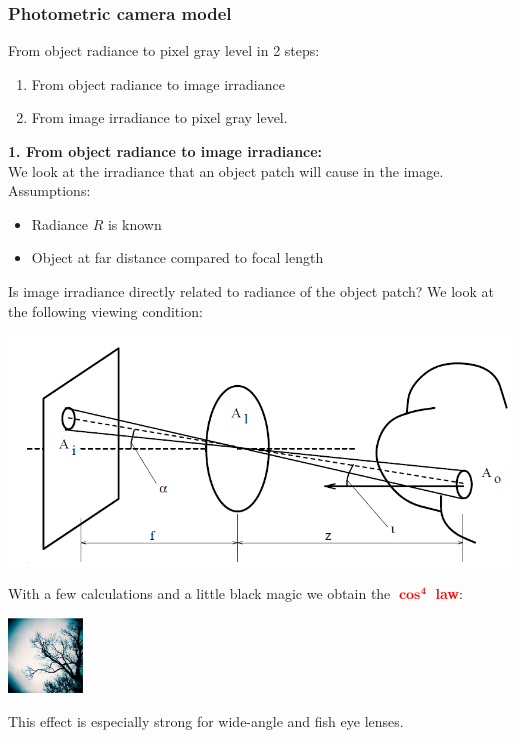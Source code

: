 \documentclass[a4paper, fontsize=8pt, landscape, DIV=1]{scrartcl}
\begin{document}
\begin{multicols*}{4}
		\subsubsection{Photometric camera model}
		From object radiance to pixel gray level in 2 steps: 
		\begin{enumerate}[noitemsep]
			\item From object radiance to image irradiance
			\item From image irradiance to pixel gray level. 
		\end{enumerate}
		\textbf{1. From object radiance to image irradiance:}\\
		We look at the irradiance that an object patch will cause in the image. Assumptions:
		\begin{itemize}[noitemsep]
			\item Radiance $R$ is known
			\item Object at far distance compared to focal length
		\end{itemize}
		Is image irradiance directly related to radiance of the object patch? We look at the following viewing condition: 
		\begin{center}
			\includegraphics[width=0.7\columnwidth]{images/ImageAcq/image_irradiance.png}\\
		\end{center}
		With a few calculations and a little black magic we obtain the \textcolor{red}{$\mathbf{\cos^4}$ \textbf{law}}:
		\begin{minipage}[b]{0.49\columnwidth}
			\begin{flushleft}
				\includegraphics[width=\columnwidth, height=2cm]{images/ImageAcq/fish_eye.png}\\
			\end{flushleft}
		\end{minipage}
		\begin{minipage}[b]{0.49\columnwidth}
			\begin{flushleft}
				This effect is especially strong for wide-angle and fish eye lenses. 
				\vspace{0.5cm}
			\end{flushleft}
		\end{minipage}
	

\end{multicols*}
\end{document}
